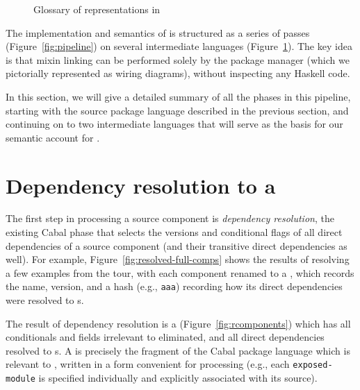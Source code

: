 \begin{figure}
\begin{mdframed}
\begin{description}
\end{description}
\caption{Glossary of representations in \Backpack{}}
\label{fig:glossary}
\end{mdframed}
\end{figure}

The implementation and semantics of \Backpack{} is structured as a
series of passes (Figure~\ref{fig:pipeline}) on several intermediate
languages (Figure~\ref{fig:glossary}).  The key idea is that mixin
linking can be performed solely by the package manager (which we
pictorially represented as wiring diagrams), without inspecting any
Haskell code.

In this section, we will give a detailed summary of all the phases in
this pipeline, starting with the source package language described in
the previous section, and continuing on to two intermediate languages
that will serve as the basis for our semantic account for \Backpack{}.

\section{Dependency resolution to a \ccomp{}}

The first step in
processing a source component is \emph{dependency resolution},
the existing Cabal phase that
selects the versions and conditional flags of all direct dependencies of
a source component (and their transitive direct dependencies as well).
For example, Figure~\ref{fig:resolved-full-comps} shows the results
of resolving a few examples from the tour, with each component renamed to
a \cid{}, which records the name, version, and a hash (e.g., \verb|aaa|)
recording how its direct dependencies were resolved to \cid{}s.

The result of dependency resolution is a \emph{\ccomp}
(Figure~\ref{fig:rcomponents}) which has all conditionals and fields
irrelevant to \Backpack{} eliminated, and all direct dependencies
resolved to \cid{}s.  A \ccomp{} is precisely the fragment of the
Cabal package language which is relevant to \Backpack{}, written in a
form convenient for processing (e.g., each \verb|exposed-module| is
specified individually and explicitly associated with its source).

